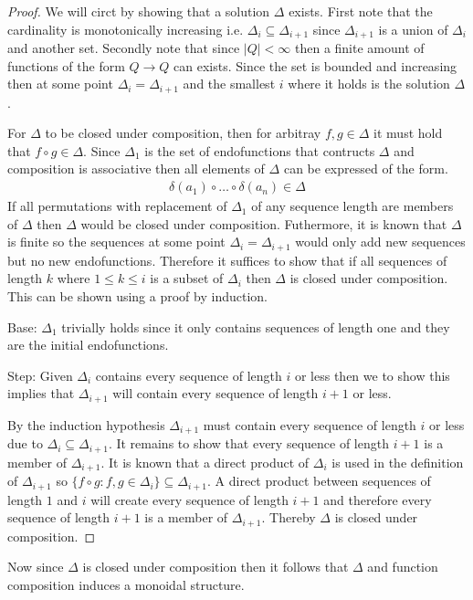 \documentclass[a4paper,12pt]{article}
\theoremstyle{definition}
\begin{document}
\begin{proof}
  We will circt by showing that a solution $\Delta$ exists. First note that the cardinality is monotonically increasing i.e. $\Delta_i \subseteq \Delta_{i + 1}$ since $\Delta_{i + 1}$ is a union of $\Delta_i$ and another set. Secondly note that since $|Q| < \infty$ then a finite amount of functions of the form $Q \to Q$ can exists. Since the set is bounded and increasing then at some point $\Delta_i = \Delta_{i + 1}$ and the smallest $i$ where it holds is the solution $\Delta$.

  For $\Delta$ to be closed under composition, then for arbitray $f, g \in \Delta$ it must hold that $f \circ g \in \Delta$. Since $\Delta_1$ is the set of endofunctions that contructs $\Delta$ and composition is associative then all elements of $\Delta$ can be expressed of the form.
  \begin{align*}
    \delta(a_1) \circ \dots \circ \delta(a_n) \in \Delta
  \end{align*}
  If all permutations with replacement of $\Delta_1$ of any sequence length are members of $\Delta$ then $\Delta$ would be closed under composition. Futhermore, it is known that $\Delta$ is finite so the sequences at some point $\Delta_i = \Delta_{i + 1}$ would only add new sequences but no new endofunctions. Therefore it suffices to show that if all sequences of length $k$ where $1 \leq k \leq i$ is a subset of $\Delta_i$ then $\Delta$ is closed under composition. This can be shown using a proof by induction.

  Base: $\Delta_1$ trivially holds since it only contains sequences of length one and they are the initial endofunctions.

  Step: Given $\Delta_i$ contains every sequence of length $i$ or less then we to show this implies that $\Delta_{i + 1}$ will contain every sequence of length $i + 1$ or less.

  By the induction hypothesis $\Delta_{i + 1}$ must contain every sequence of length $i$ or less due to $\Delta_i \subseteq \Delta_{i + 1}$. It remains to show that every sequence of length $i + 1$ is a member of $\Delta_{i + 1}$. It is known that a direct product of $\Delta_i$ is used in the definition of $\Delta_{i + 1}$ so $\{f \circ g : f, g \in \Delta_i\} \subseteq \Delta_{i + 1}$. A direct product between sequences of length $1$ and $i$ will create every sequence of length $i + 1$ and therefore every sequence of length $i + 1$ is a member of $\Delta_{i + 1}$. Thereby $\Delta$ is closed under composition.
\end{proof}
\noindent Now since $\Delta$ is closed under composition then it follows that $\Delta$ and function composition induces a monoidal structure.
\end{document}
